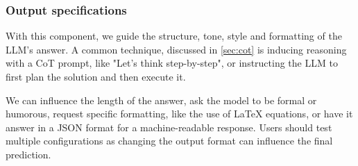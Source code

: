 \subsubsection{Output specifications}
With this component, we guide the structure, tone, style and formatting of the LLM's answer. 
A common technique, discussed in \ref{sec:cot} is inducing reasoning
with a CoT prompt, like "Let's think step-by-step", or instructing the LLM to 
first plan the solution and then execute it. 

We can influence the length of the answer, ask the model to be formal or humorous,
request specific formatting, like the use of \LaTeX{} equations, or have it answer in a JSON format
for a machine-readable response. Users should test multiple configurations as changing the output format
can influence the final prediction\cite{salinas2024butterflyeffectalteringprompts}.
